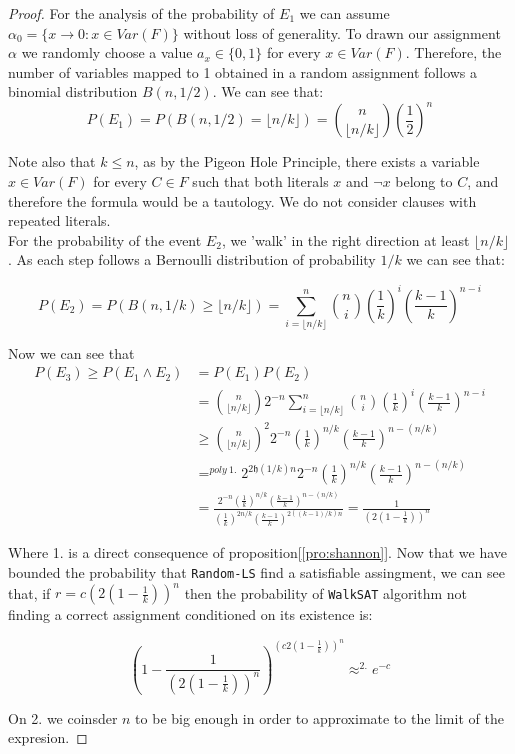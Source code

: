 \begin{proof}
For the analysis of the probability of $E_1$ we can assume $\alpha_0 = \{ x \to 0 : x \in Var(F)\}$ without loss of generality. To drawn our assignment $\alpha$ we randomly choose a value $a_x \in \{0,1\}$ for every $x \in Var(F)$. Therefore, the number of variables mapped to 1 obtained in a random assignment follows a binomial distribution $B(n, 1/2)$. We can see that:
$$P(E_1) = P(B(n,1/2) = \lfloor n/k\rfloor) = {\displaystyle {n \choose \lfloor n/k\rfloor }  \left (\frac{1}{2}\right )^{n}} $$

Note also that $k\le n$, as by the Pigeon Hole Principle, there exists a variable $x\in Var(F)$ for every $C\in F$ such that both literals $x$ and $\neg x$ belong to $C$, and therefore the formula would be a tautology. We do not consider clauses with repeated literals.\\

For the probability of the event $E_2$, we 'walk' in the right direction at least $\lfloor n/k\rfloor$. As each step follows a Bernoulli distribution of probability $1/k$ we can see that:

$$P(E_2) =  P(B(n,1/k) \ge \lfloor n/k\rfloor) = {\displaystyle \sum _{i=\lfloor n/k\rfloor }^{n}{n \choose i }  \left (\frac{1}{k}\right )^{i}  \left (\frac{k-1}{k}\right )^{n-i}} $$


Now we can see that
\begin{equation}
  \begin{split}
    P(E_3) \ge P(E_1 \land E_2)  & = P(E_1)P(E_2) \\
    & = {\displaystyle {n \choose \lfloor n/k\rfloor  }  2^{-n}} {\displaystyle \sum _{i=\lfloor n/k\rfloor }^{n}{n \choose i }  \left (\frac{1}{k}\right )^{i}  \left (\frac{k-1}{k}\right )^{n-i}}\\
    & \ge {\displaystyle {n \choose \lfloor n/k\rfloor  }^2  2^{-n}   \left (\frac{1}{k}\right )^{n/k}  \left (\frac{k-1}{k}\right )^{n-( n/k)}  } \\
    & =^{poly \ 1.} {\displaystyle 2^{2\mathfrak{h}(1/k) n}  2^{-n}   \left (\frac{1}{k}\right )^{ n/k}  \left (\frac{k-1}{k}\right )^{n-( n/k )}  }\\
    & = \frac{ 2^{-n}   \left (\frac{1}{k}\right )^{ n/k}  \left (\frac{k-1}{k}\right )^{n-( n/k )} }{(\frac{1}{k})^{2n/k} (\frac{k-1}{k})^{2((k-1)/k)n}  }
     =\frac{1}{\left ( 2\left (1-\frac{1}{k}\right ) \right )^n} 
  \end{split}
\end{equation}

Where 1. is a direct consequence of proposition[\ref{pro:shannon}]. Now that we have bounded the probability that \texttt{Random-LS} find a satisfiable assingment, we can see that, if $r = c \left ( 2\left (1-\frac{1}{k}\right ) \right )^n$ then the probability of \texttt{WalkSAT} algorithm not finding a correct assignment conditioned on its existence is:

$$ \left ( 1-  \frac{1}{\left ( 2\left (1-\frac{1}{k}\right ) \right )^n} \right )^{\left ( c2\left (1-\frac{1}{k}\right ) \right )^n}  \approx^{2.} e^{-c}$$

On 2. we coinsder $n$ to be big enough in order to approximate to the limit of the expresion.
\end{proof}


